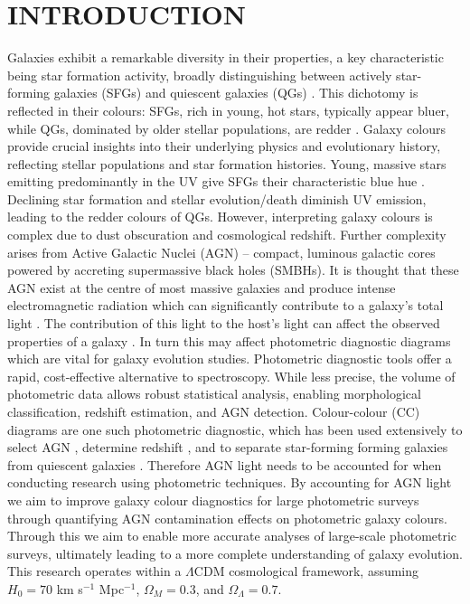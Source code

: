 \documentclass[
  journal=pasa,
  manuscript=research-paper,
  year=202X,
  volume=YY,
]{cup-journal}
\begin{document}
\section{INTRODUCTION}
\label{sec:introduction}
Galaxies exhibit a remarkable diversity in their properties, a key characteristic being star formation activity, broadly distinguishing between actively star-forming galaxies (SFGs) and quiescent galaxies (QGs) \citep{whitaker_newfirm_2011}.  This dichotomy is reflected in their colours: SFGs, rich in young, hot stars, typically appear bluer, while QGs, dominated by older stellar populations, are redder \citep{baldry_quantifying_2004}. Galaxy colours provide crucial insights into their underlying physics and evolutionary history, reflecting stellar populations and star formation histories. Young, massive stars emitting predominantly in the UV give SFGs their characteristic blue hue \citep{madau_cosmic_2014}. Declining star formation and stellar evolution/death diminish UV emission, leading to the redder colours of QGs. However, interpreting galaxy colours is complex due to dust obscuration and cosmological redshift. 
Further complexity arises from Active Galactic Nuclei (AGN) – compact, luminous galactic cores powered by accreting supermassive black holes (SMBHs). It is thought that these AGN exist at the centre of most massive galaxies and produce intense electromagnetic radiation which can significantly contribute to a galaxy's total light \citep{elvis_atlas_1994}. The contribution of this light to the host's light can affect the observed properties of a galaxy \citep{cowley_decoupled_2018}. In turn this may affect photometric diagnostic diagrams which are vital for galaxy evolution studies. Photometric diagnostic tools offer a rapid, cost-effective alternative to spectroscopy. While less precise, the volume of photometric data allows robust statistical analysis, enabling morphological classification, redshift estimation, and AGN detection. Colour-colour (CC) diagrams are one such photometric diagnostic, which has been used extensively to select AGN \citep{lacy_obscured_2004, messias_dependency_2014, donley_spitzer_2007}, determine redshift \citep{giavalisco_lyman-break_2002}, and to separate star-forming forming galaxies from quiescent galaxies \citep{whitaker_newfirm_2011}. Therefore AGN light needs to be accounted for when conducting research using photometric techniques. By accounting for AGN light we aim to improve galaxy colour diagnostics for large photometric surveys through quantifying AGN contamination effects on photometric galaxy colours. Through this we aim to enable more accurate analyses of large-scale photometric surveys, ultimately leading to a more complete understanding of galaxy evolution. This research operates within a $\Lambda$CDM cosmological framework, assuming $H_0 = 70$ km s$^{-1}$ Mpc$^{-1}$, $\Omega_M = 0.3$, and $\Omega_{\Lambda} = 0.7$.
\end{document}
